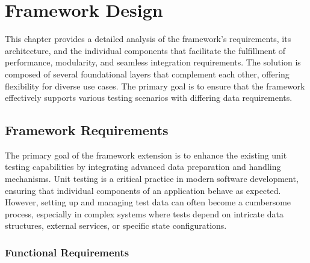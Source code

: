
\chapter{Framework Design\label{chap:framework_design}}

This chapter provides a detailed analysis of the framework's requirements, its architecture, and the individual components that facilitate the fulfillment of performance, modularity, and seamless integration requirements. The solution is composed of several foundational layers that complement each other, offering flexibility for diverse use cases. The primary goal is to ensure that the framework effectively supports various testing scenarios with differing data requirements.

\section{Framework Requirements}

The primary goal of the framework extension is to
enhance the existing unit testing capabilities by integrating advanced data preparation and handling mechanisms.
Unit testing is a critical practice in modern software development,
ensuring that individual components of an application behave as expected.
However, setting up and managing test data can often become a cumbersome process,
especially in complex systems where tests depend on intricate data structures,
external services, or specific state configurations.
\subsection*{Functional Requirements}

